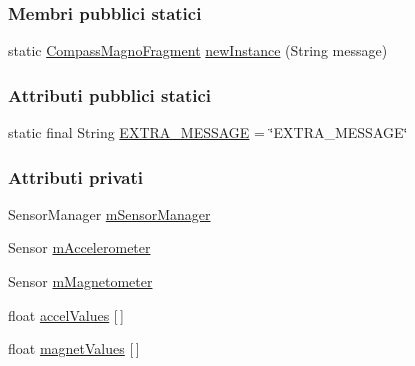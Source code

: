 \subsubsection*{Membri pubblici statici}
\begin{DoxyCompactItemize}
\item 
static \hyperlink{classit_1_1unibo_1_1torsello_1_1bluetoothpositioning_1_1fragment_1_1oldFragment_1_1CompassMagnoFragment}{Compass\+Magno\+Fragment} \hyperlink{classit_1_1unibo_1_1torsello_1_1bluetoothpositioning_1_1fragment_1_1oldFragment_1_1CompassMagnoFragment_a2fdc7669262528be61e2e0165b6a8901_a2fdc7669262528be61e2e0165b6a8901}{new\+Instance} (String message)
\end{DoxyCompactItemize}
\subsubsection*{Attributi pubblici statici}
\begin{DoxyCompactItemize}
\item 
static final String \hyperlink{classit_1_1unibo_1_1torsello_1_1bluetoothpositioning_1_1fragment_1_1oldFragment_1_1CompassMagnoFragment_ad570a334dd03dbb05b6615a4df79e811_ad570a334dd03dbb05b6615a4df79e811}{E\+X\+T\+R\+A\+\_\+\+M\+E\+S\+S\+A\+GE} = \char`\"{}E\+X\+T\+R\+A\+\_\+\+M\+E\+S\+S\+A\+GE\char`\"{}
\end{DoxyCompactItemize}
\subsubsection*{Attributi privati}
\begin{DoxyCompactItemize}
\item 
Sensor\+Manager \hyperlink{classit_1_1unibo_1_1torsello_1_1bluetoothpositioning_1_1fragment_1_1oldFragment_1_1CompassMagnoFragment_ae6b91ce34c58940e5f936dba964d6182_ae6b91ce34c58940e5f936dba964d6182}{m\+Sensor\+Manager}
\item 
Sensor \hyperlink{classit_1_1unibo_1_1torsello_1_1bluetoothpositioning_1_1fragment_1_1oldFragment_1_1CompassMagnoFragment_ae5b2153973fd62a9142fa372461808c5_ae5b2153973fd62a9142fa372461808c5}{m\+Accelerometer}
\item 
Sensor \hyperlink{classit_1_1unibo_1_1torsello_1_1bluetoothpositioning_1_1fragment_1_1oldFragment_1_1CompassMagnoFragment_a7ff1cf69c59de3ce3b93de90501d1848_a7ff1cf69c59de3ce3b93de90501d1848}{m\+Magnetometer}
\item 
float \hyperlink{classit_1_1unibo_1_1torsello_1_1bluetoothpositioning_1_1fragment_1_1oldFragment_1_1CompassMagnoFragment_a6fd163a92ff4354d07d7eefbeed24b62_a6fd163a92ff4354d07d7eefbeed24b62}{accel\+Values} \mbox{[}$\,$\mbox{]}
\item 
float \hyperlink{classit_1_1unibo_1_1torsello_1_1bluetoothpositioning_1_1fragment_1_1oldFragment_1_1CompassMagnoFragment_aa8991b737848cba64dc1ebd397f5a390_aa8991b737848cba64dc1ebd397f5a390}{magnet\+Values} \mbox{[}$\,$\mbox{]}
\end{DoxyCompactItemize}


